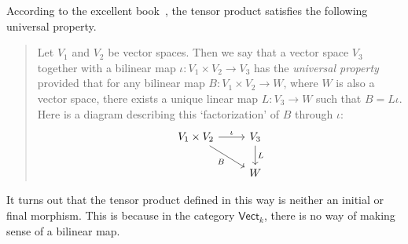 \documentclass[notes.tex]{subfiles}
\begin{document}
\begin{example}
  \label{eg:universalpropertyoftensorproduct}
  According to the excellent book~\cite{sontz-principal-bundles-classical}, the tensor product satisfies the following universal property.
  \begin{quote}
    Let $V_{1}$ and $V_{2}$ be vector spaces. Then we say that a vector space $V_{3}$ together with a bilinear map $\iota\colon V_{1} \times V_{2} \to V_{3}$ has the \emph{universal property} provided that for any bilinear map $B\colon V_{1} \times V_{2} \to W$, where $W$ is also a vector space, there exists a unique linear map $L\colon V_{3} \to W$ such that $B = L\iota$. Here is a diagram describing this `factorization' of $B$ through $\iota$:
    \begin{equation*}
      \begin{tikzcd}
        V_{1} \times V_{2} \arrow[r, "\iota"] \arrow[rd, swap, "B"] & V_{3} \arrow[d, "L"] \\
        & W
      \end{tikzcd}
    \end{equation*}
  \end{quote}

  It turns out that the tensor product defined in this way is neither an initial or final morphism. This is because in the category $\mathsf{Vect}_{k}$, there is no way of making sense of a bilinear map.
\end{example}
\end{document}
